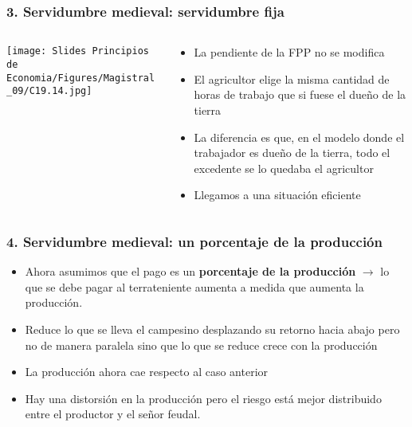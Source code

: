 \documentclass{beamer}
\begin{document}

\begin{frame}
\frametitle{3. Servidumbre medieval: servidumbre fija}

\begin{columns}
  \begin{column}{0.55\textwidth}
    \centering
    \texttt{[image: Slides Principios de Economia/Figures/Magistral\_09/C19.14.jpg]}
  \end{column}

\begin{column}{0.45\textwidth}
    \begin{itemize}
        \item \small La pendiente de la FPP no se modifica
        \item \small El agricultor elige la misma cantidad de horas de trabajo que si fuese el dueño de la tierra    \item \small La diferencia es que, en el modelo donde el trabajador es dueño de la tierra, todo el excedente se lo quedaba el agricultor
        \item \small Llegamos a una situación eficiente
    \end{itemize}
  \end{column}
\end{columns}

\end{frame}

\begin{frame}
\frametitle{4. Servidumbre medieval: un porcentaje de la producción }
\begin{itemize}
    \item Ahora asumimos que el pago es un \textbf{porcentaje de la producción} $\rightarrow$ lo que se debe pagar al terrateniente aumenta a medida que aumenta la producción.
    \item Reduce lo que se lleva el campesino desplazando su retorno hacia abajo pero no de manera paralela sino que lo que se reduce crece con la producción
    \item La producción ahora cae respecto al caso anterior
     \item Hay una distorsión en la producción pero el riesgo está mejor distribuido entre el productor y el señor feudal. 
\end{itemize}
\end{frame}
\end{document}
